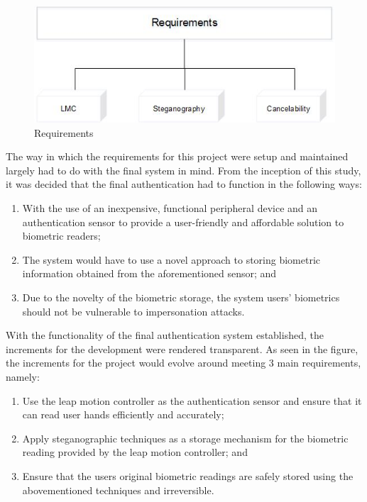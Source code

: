     
    \begin{figure}[htbp!] 
    \centering    
    \includegraphics[width=1.0\textwidth]{Chapter3/Figs/Requirements.jpg}
    \caption[Requirements]{Requirements}
    \label{fig:Requirements}
    \end{figure}    
    
    The way in which the requirements for this project were setup and maintained largely had to do with the final system in mind. From the inception of this study, it was decided that the final authentication had to function in the following ways:
    
    \begin{enumerate}[label=\roman*.]
    	\item With the use of an inexpensive, functional peripheral device and an authentication sensor to provide a user-friendly and affordable solution to biometric readers;
    	\item The system would have to use a novel approach to storing biometric information obtained from the aforementioned sensor; and
    	\item Due to the novelty of the biometric storage, the system users’ biometrics should not be vulnerable to impersonation attacks.
    \end{enumerate}
    
With the functionality of the final authentication system established, the increments for the development were rendered transparent. As seen in the figure, the increments for the project would evolve around meeting 3 main requirements, namely:

    \begin{enumerate}[label=\roman*.]
        \item Use the leap motion controller as the authentication sensor and ensure that it can read user hands efficiently and accurately;
        \item Apply steganographic techniques as a storage mechanism for the biometric reading provided by the leap motion controller; and
        \item Ensure that the users original biometric readings are safely stored using the abovementioned techniques and irreversible.
    \end{enumerate}
    
